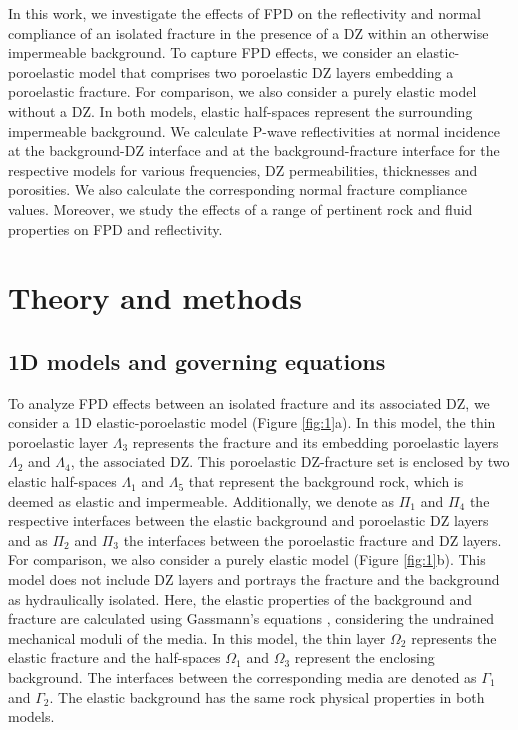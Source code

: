 \documentclass[draft]{agujournal2019}
\begin{document}
In this work, we investigate the effects of FPD on the reflectivity  and normal compliance of an isolated fracture in the  presence of a DZ within an otherwise impermeable background.
To capture FPD effects, we consider an elastic-poroelastic model that comprises two poroelastic DZ layers embedding a poroelastic fracture. For comparison, we also consider a purely elastic model without a DZ. In both models, elastic half-spaces represent the surrounding impermeable background.
We calculate P-wave reflectivities at normal incidence at the background-DZ interface and at the background-fracture interface for the respective models for various frequencies, DZ permeabilities, thicknesses and porosities. We also calculate the corresponding normal fracture compliance values. Moreover, we study the effects of a range of pertinent rock and fluid properties on FPD and reflectivity.

\section{Theory and methods}
\subsection{1D models and governing equations}
\begin{sloppypar}
To analyze FPD effects between an isolated fracture and its associated DZ, we consider a 1D elastic-poro\-elastic model (Figure \ref{fig:1}a). In this model, the thin poro\-elastic layer $\Lambda_3$ represents the fracture and its embedding poro\-elastic layers $\Lambda_2$ and $\Lambda_4$, the associated DZ. This poroelastic DZ-fracture set is enclosed by two elastic half-spaces $\Lambda_1$ and $\Lambda_5$ that represent the  background rock, which is deemed as elastic and impermeable.
Additionally, we denote as $\Pi_1$ and $\Pi_4$ the respective interfaces between the elastic background and poro\-elastic DZ layers and as $\Pi_2$ and $\Pi_3$ the interfaces between the poro\-elastic fracture and DZ layers. 
For comparison, we also consider a purely elastic model (Figure \ref{fig:1}b). This model does not include DZ layers and portrays the fracture and the background as hydraulically isolated. Here, the elastic properties of the background and fracture are calculated using Gassmann's equations \cite{Gassmann1951}, considering the undrained mechanical moduli of the media.
In this model, the thin layer $\Omega_2$ represents the elastic fracture and the half-spaces $\Omega_1$ and $\Omega_3$ represent the enclosing background. The interfaces between the corresponding media are denoted as $\Gamma_1$ and $\Gamma_2$. The elastic background has the same rock physical properties in both models.
\end{sloppypar}
\end{document}

